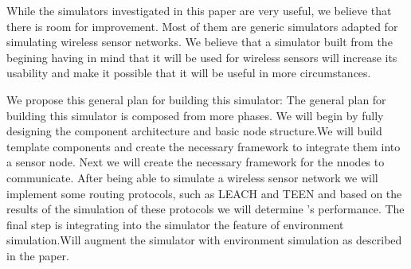 
While the simulators investigated in this paper are very useful, we believe
that there is room for improvement. Most of them are generic simulators
adapted for simulating wireless sensor networks. We believe that a simulator
built from the begining having in mind that it will be used for wireless
sensors will increase its usability and make it possible that it will be
useful in more circumstances.

We propose this general plan for building this simulator:
The general plan for building this simulator is composed from more phases. We
will begin by fully designing the component architecture and basic node
structure.We will build template components and create the necessary framework to integrate them 
into a sensor node. Next we will create the necessary framework for the nnodes
to communicate. 
After being able to simulate a wireless sensor network we will implement some
routing protocols, such as LEACH and TEEN and based on the results of the
simulation of these protocols we will determine \codename's performance.
The final step is integrating into the simulator the feature of environment
simulation.Will augment the simulator with environment simulation as described in the paper.
